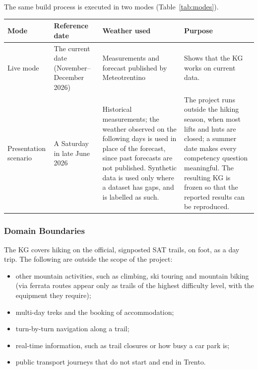 \noindent The same build process is executed in two modes (Table~\ref{tab:modes}).

\begin{center}
\small
\renewcommand{\arraystretch}{1.3}
\begin{tabularx}{\linewidth}{|>{\raggedright\arraybackslash}p{2.4cm}|>{\raggedright\arraybackslash}p{3cm}|>{\raggedright\arraybackslash}X|>{\raggedright\arraybackslash}X|}
\hline
\textbf{Mode} & \textbf{Reference date} & \textbf{Weather used} & \textbf{Purpose} \\ \hline
Live mode & The current date (November--December 2026) & Measurements and forecast published by Meteotrentino & Shows that the KG works on current data. \\ \hline
Presentation scenario & A Saturday in late June 2026 & Historical measurements; the weather observed on the following days is used in place of the forecast, since past forecasts are not published. Synthetic data is used only where a dataset has gaps, and is labelled as such. & The project runs outside the hiking season, when most lifts and huts are closed; a summer date makes every competency question meaningful. The resulting KG is frozen so that the reported results can be reproduced. \\ \hline
\end{tabularx}
\label{tab:modes}
\end{center}

\subsubsection{Domain Boundaries}
The KG covers hiking on the official, signposted SAT trails, on foot, as a day trip. The following are outside the scope of the project:
\begin{itemize}
    \item other mountain activities, such as climbing, ski touring and mountain biking (via ferrata routes appear only as trails of the highest difficulty level, with the equipment they require);
    \item multi-day treks and the booking of accommodation;
    \item turn-by-turn navigation along a trail;
    \item real-time information, such as trail closures or how busy a car park is;
    \item public transport journeys that do not start and end in Trento.
\end{itemize}

